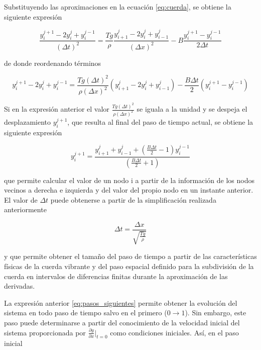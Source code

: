 \documentclass[11pt]{article}
\begin{document}
Substituyendo las aproximaciones en la ecuación \eqref{eq:cuerda}, se obtiene la siguiente
expresión

\begin{equation}
\frac{y^{j+1}_i - 2y^j_i + y^{j-1}_i}{(\Delta{t})^2} = 
	\frac{Tg}{\rho}\frac{y^j_{i+1} - 2y^j_i + y^j_{i-1}}{(\Delta{x})^2}
	- B \frac{y^{j+1}_i - y^{j-1}_i}{2\Delta{t}}
\end{equation}

de donde reordenando términos 

\begin{equation}
y^{j+1}_{i} - 2y^{j}_i + y^{j-1}_i = \frac{Tg(\Delta{t})^2}{\rho(\Delta{x})^2}
	(y^j_{i+1} - 2y^j_i + y^j_{i-1}) - \frac{B\Delta{t}}{2}(y^{j+1}_i - y^{j-1}_i)
\label{eq:aproximacion}
\end{equation}

Si en la expresión anterior el valor $\frac{Tg(\Delta{t})^2}{\rho(\Delta{x})^2}$ se iguala
a la unidad y se despeja el desplazamiento $y^{j+1}_i$, que resulta al final del paso de
tiempo actual, se obtiene la siguiente expresión

\begin{equation}
y^{j+1}_i = \frac{y^j_{i+1} + y^j_{i-1} + (\frac{B\Delta{t}}{2} - 1)y^{j-1}_i}{(\frac{B\Delta{t}}{2} + 1)}
\label{eq:pasos_siguientes}
\end{equation}

que permite calcular el valor de un nodo i a partir de la información de los nodos vecinos
a derecha e izquierda y del valor del propio nodo en un instante anterior. El valor de 
$\Delta{t}$ puede obtenerse a partir de la simplificación realizada anteriormente 

\begin{equation}
\Delta{t} = \frac{\Delta{x}}{\sqrt{\frac{Tg}{\rho}}}
\label{eq:paso_tiempo}
\end{equation}

y que permite obtener el tamaño del paso de tiempo a partir de las características físicas
de la cuerda vibrante y del paso espacial definido para la subdivisión de la cuerda en
intervalos de diferencias finitas durante la aproximación de las derivadas.

La expresión anterior \eqref{eq:pasos_siguientes} permite obtener la evolución del sistema
en todo paso de tiempo salvo en el primero ($0 \rightarrow 1$). Sin embargo, este paso
puede determinarse a partir del conocimiento de la velocidad inicial del sistema
proporcionada por $\frac{\partial{y}}{\partial{x}}|_{t=0}$ como condiciones iniciales.
Así, en el paso inicial
\end{document}
